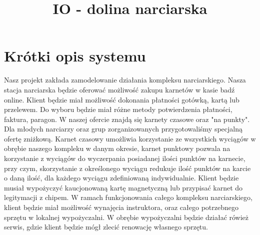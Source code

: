 \documentclass{sprawozdanie-agh}
\title{IO - dolina narciarska}
\begin{document}

\stronatytulowa{}

\section{Krótki opis systemu}
\large
Nasz projekt zakłada zamodelowanie działania kompleksu narciarskiego. Nasza stacja narciarska będzie oferować możliwość zakupu karnetów w kasie badź online. Klient będzie miał możliwość dokonania płatności gotówką, kartą lub przelewem. Do wyboru będzie miał różne metody potwierdzenia płatności, faktura, paragon. W naszej ofercie znajdą się karnety czasowe oraz "na punkty". Dla młodych narciarzy oraz grup zorganizowanych przygotowaliśmy specjalną ofertę zniżkową. Karnet czasowy umożliwia korzystanie ze wszystkich wyciągów w obrębie naszego kompleku w danym okresie, karnet punktowy pozwala na korzystanie z wyciągów do wyczerpania posiadanej ilości punktów na karnecie, przy czym, skorzystanie z określonego wyciągu redukuje ilość punktów na karcie o daną ilość, dla każdego wyciągu zdefiniowaną indywidualnie. Klient będzie musiał wypożyczyć kaucjonowaną kartę magnetyczną lub przypisać karnet do legitymacji z chipem. W ramach funkcjonowania całego kompleksu narciarskiego, klient będzie miał możliwość wynajęcia instruktora, oraz całego potrzebnego sprzętu w lokalnej wypożyczalni. W obrębie wypożyczalni będzie działać rówież serwis, gdzie klient będzie mógł zlecić renowację własnego sprzętu.
\end{document}
